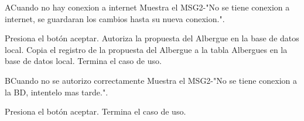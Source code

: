 \begin{UCtrayectoriaA}{A}{Cuando no hay conexion a internet}
	\UCpaso Muestra el MSG2-"No se tiene conexion a internet, se guardaran los cambios hasta su nueva conexion.".
	\item\UCactor Presiona el botón aceptar.
	\UCpaso Autoriza la propuesta del Albergue en la base de datos local.	
	\UCpaso Copia el registro de la propuesta del Albergue a la tabla Albergues en la base de datos local.
	\UCpaso[] Termina el caso de uso.
\end{UCtrayectoriaA}

\begin{UCtrayectoriaA}{B}{Cuando no se autorizo correctamente}
	\UCpaso Muestra el MSG2-"No se tiene conexion a la BD, intentelo mas tarde.".
	\item\UCactor Presiona el botón aceptar.
	\UCpaso[] Termina el caso de uso.
\end{UCtrayectoriaA}